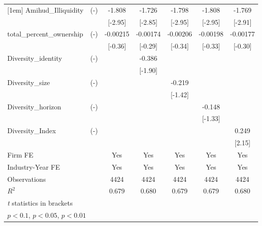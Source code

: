 {\begin{tabular}{lc*{5}{c}}
[1em]
Amihud\_Illiquidity&    (-)     &      -1.808\sym{***}&      -1.726\sym{***}&      -1.798\sym{***}&      -1.808\sym{***}&      -1.769\sym{***}\\
            &            &     [-2.95]         &     [-2.85]         &     [-2.95]         &     [-2.95]         &     [-2.91]         \\
[1em]
total\_percent\_ownership&    (-)     &    -0.00215         &    -0.00174         &    -0.00206         &    -0.00198         &    -0.00177         \\
            &            &     [-0.36]         &     [-0.29]         &     [-0.34]         &     [-0.33]         &     [-0.30]         \\
[1em]
Diversity\_identity&    (-)     &                     &      -0.386\sym{*}  &                     &                     &                     \\
            &            &                     &     [-1.90]         &                     &                     &                     \\
[1em]
Diversity\_size&    (-)     &                     &                     &      -0.219         &                     &                     \\
            &            &                     &                     &     [-1.42]         &                     &                     \\
[1em]
Diversity\_horizon&    (-)     &                     &                     &                     &      -0.148         &                     \\
            &            &                     &                     &                     &     [-1.33]         &                     \\
[1em]
Diversity\_Index&    (-)     &                     &                     &                     &                     &       0.249\sym{**} \\
            &            &                     &                     &                     &                     &      [2.15]         \\
\hline
Firm FE     &            &         Yes         &         Yes         &         Yes         &         Yes         &         Yes         \\
Industry-Year FE&            &         Yes         &         Yes         &         Yes         &         Yes         &         Yes         \\
Observations&            &        4424         &        4424         &        4424         &        4424         &        4424         \\
$ R^2 $     &            &       0.679         &       0.680         &       0.679         &       0.679         &       0.680         \\
\hline\hline
\multicolumn{7}{l}{\footnotesize \textit{t} statistics in brackets}\\
\multicolumn{7}{l}{\footnotesize \sym{*} \(p<0.1\), \sym{**} \(p<0.05\), \sym{***} \(p<0.01\)}\\
\end{tabular}
}
